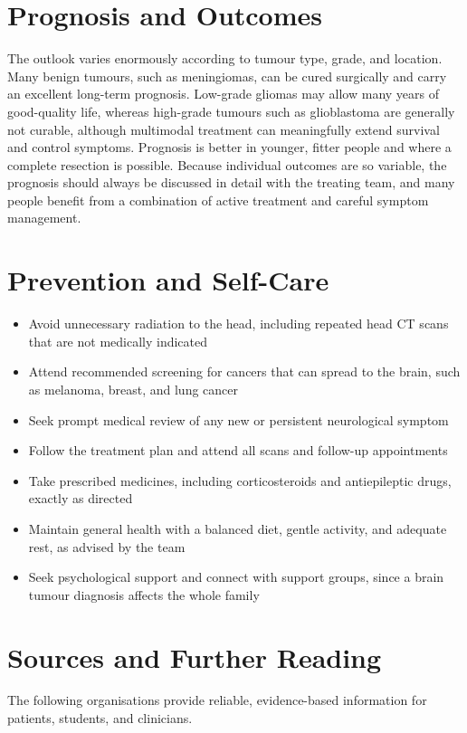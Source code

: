 \section*{Prognosis and Outcomes}
The outlook varies enormously according to tumour type, grade, and location. Many benign tumours, such as meningiomas, can be cured surgically and carry an excellent long-term prognosis. Low-grade gliomas may allow many years of good-quality life, whereas high-grade tumours such as glioblastoma are generally not curable, although multimodal treatment can meaningfully extend survival and control symptoms. Prognosis is better in younger, fitter people and where a complete resection is possible. Because individual outcomes are so variable, the prognosis should always be discussed in detail with the treating team, and many people benefit from a combination of active treatment and careful symptom management.

\section*{Prevention and Self-Care}
\begin{itemize}
    \item Avoid unnecessary radiation to the head, including repeated head CT scans that are not medically indicated
    \item Attend recommended screening for cancers that can spread to the brain, such as melanoma, breast, and lung cancer
    \item Seek prompt medical review of any new or persistent neurological symptom
    \item Follow the treatment plan and attend all scans and follow-up appointments
    \item Take prescribed medicines, including corticosteroids and antiepileptic drugs, exactly as directed
    \item Maintain general health with a balanced diet, gentle activity, and adequate rest, as advised by the team
    \item Seek psychological support and connect with support groups, since a brain tumour diagnosis affects the whole family
\end{itemize}

\section*{Sources and Further Reading}
The following organisations provide reliable, evidence-based information for patients, students, and clinicians.

